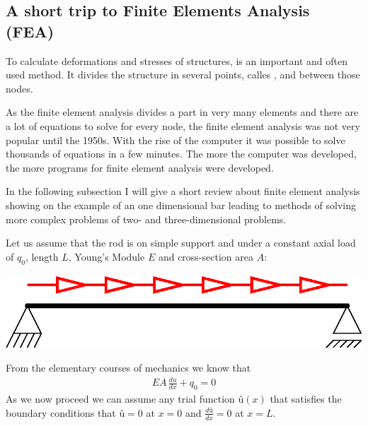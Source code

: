 \subsection{A short trip to Finite Elements Analysis (FEA)}
To calculate deformations and stresses of structures,  is an important and often used method. It divides the structure in several points, calles , and  between those nodes. 
\bigskip

As the finite element analysis divides a part in very many elements and there are a lot of equations to solve for every node, the finite element analysis was not very popular until the 1950s. With the rise of the computer it was possible to solve thousands of equations in a few minutes. The more the computer was developed, the more programs for finite element analysis were developed.
\bigskip

In the following subsection I will give a short review about finite element analysis showing on the example of an one dimensional bar leading to methods of solving more complex problems of two- and three-dimensional problems.
\bigskip

Let us assume that the rod is on simple support and under a constant axial load of $q_0$, length $L$, Young's Module $E$ and cross-section area $A$:
\bigskip

\begin{center}
\includegraphics[scale=1]{OneDimensionalBar}
\end{center}
\bigskip
From the elementary courses of mechanics we know that
\begin{align}
EA\,\frac{du}{dx}+q_0=0 \label{Rod_Main}
\end{align}
As we now proceed we can assume any trial function $û(x)$ that satisfies the boundary conditions that $û=0$ at $x=0$ and $\frac{dû}{dx}=0$ at $x=L$.

